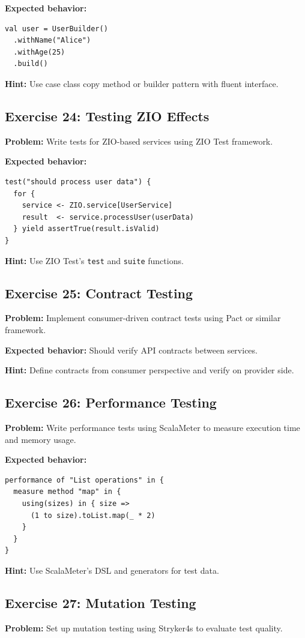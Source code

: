 \documentclass[12pt,a4paper]{article}
\begin{document}
\textbf{Expected behavior:}
\begin{lstlisting}
val user = UserBuilder()
  .withName("Alice")
  .withAge(25)
  .build()
\end{lstlisting}

\textbf{Hint:} Use case class copy method or builder pattern with fluent interface.

\subsection{Exercise 24: Testing ZIO Effects}
\textbf{Problem:} Write tests for ZIO-based services using ZIO Test framework.

\textbf{Expected behavior:}
\begin{lstlisting}
test("should process user data") {
  for {
    service <- ZIO.service[UserService]
    result  <- service.processUser(userData)
  } yield assertTrue(result.isValid)
}
\end{lstlisting}

\textbf{Hint:} Use ZIO Test's \texttt{test} and \texttt{suite} functions.

\subsection{Exercise 25: Contract Testing}
\textbf{Problem:} Implement consumer-driven contract tests using Pact or similar framework.

\textbf{Expected behavior:} Should verify API contracts between services.

\textbf{Hint:} Define contracts from consumer perspective and verify on provider side.

\subsection{Exercise 26: Performance Testing}
\textbf{Problem:} Write performance tests using ScalaMeter to measure execution time and memory usage.

\textbf{Expected behavior:}
\begin{lstlisting}
performance of "List operations" in {
  measure method "map" in {
    using(sizes) in { size =>
      (1 to size).toList.map(_ * 2)
    }
  }
}
\end{lstlisting}

\textbf{Hint:} Use ScalaMeter's DSL and generators for test data.

\subsection{Exercise 27: Mutation Testing}
\textbf{Problem:} Set up mutation testing using Stryker4s to evaluate test quality.
\end{document}
